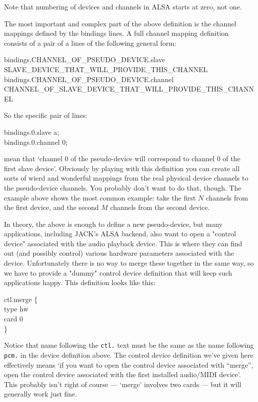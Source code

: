 \documentclass[10pt,a4paper]{book}
\begin{document}
{\begin{enumerate}
\begin{itemize}
\begin{itemize}
\end{itemize}

Note that numbering of devices and channels in ALSA starts at zero,
not one.

The most important and complex part of the above definition is the
channel mappings defined by the bindings lines. A full channel mapping
definition consists of a pair of a lines of the following general
form:

\begin{listing}
bindings.CHANNEL\_OF\_PSEUDO\_DEVICE.slave SLAVE\_DEVICE\_THAT\_WILL\_PROVIDE\_THIS\_CHANNEL\\
bindings.CHANNEL\_OF\_PSEUDO\_DEVICE.channel CHANNEL\_OF\_SLAVE\_DEVICE\_THAT\_WILL\_PROVIDE\_THIS\_CHANNEL
\end{listing}

So the specific pair of lines:

\begin{listing}
bindings.0.slave a;\\
bindings.0.channel 0;
\end{listing}

mean that `channel 0 of the pseudo-device will correspond to channel 0
of the first slave device'. Obviously by playing with this definition
you can create all sorts of wierd and wonderful mappings from the real
physical device channels to the pseudo-device channels. You probably
don't want to do that, though. The example above shows the most common
example: take the first $N$ channels from the first device, and the
second $M$ channels from the second device.

In theory, the above is enough to define a new pseudo-device, but many
applications, including JACK's ALSA backend, also want to open a
"control device" associated with the audio playback device. This is
where they can find out (and possibly control) various hardware
parameters associated with the device. Unfortunately there is no way
to merge these together in the same way, so we have to provide a
"dummy" control device definition that will keep such applications
happy. This definition looks like this:

\begin{listing}
ctl.merge \{\\
    type hw\\
    card 0\\
\}
\end{listing}

Notice that name following the \texttt{ctl.} text must be the same as
the name following \texttt{pcm.} in the device definition above. The
control device definition we've given here effectively means `if you
want to open the control device associated with ``merge'', open the
control device associated with the first installed audio/MIDI
device'. This probably isn't right of course --- `merge' involves two
cards --- but it will generally work just fine.


\end{itemize}
\end{enumerate}}
\end{document}
